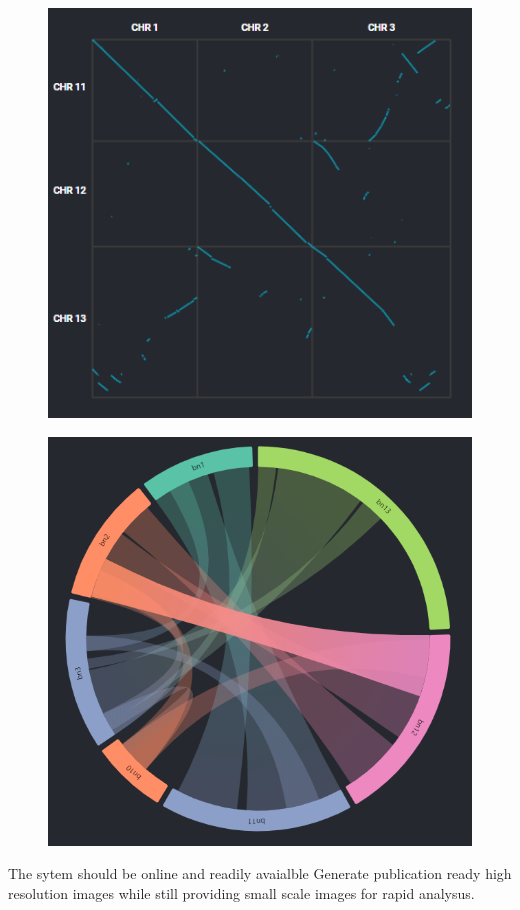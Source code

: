 \begin{figure}
\centering
\begin{minipage}{.5\textwidth}
  \centering
  \includegraphics[width=.75\linewidth]{images/ch_1_dot_plot.PNG}
  \label{fig:ch_1_dot_plot}
\end{minipage}%
\begin{minipage}{.5\textwidth}
  \centering
  \includegraphics[width=.75\linewidth]{images/ch_1_circos_plot.PNG}
  \label{fig:ch_1_circos_plot}
\end{minipage}
\end{figure}


The sytem should be online and readily avaialble
Generate publication ready high resolution images while still providing small scale images for rapid analysus.








